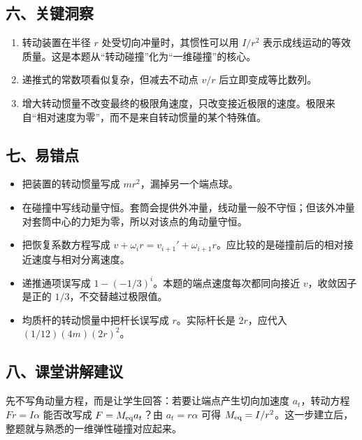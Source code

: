 \documentclass[12pt,a4paper,UTF8]{ctexart}
\newcommand{\tightlist}{\setlength{\itemsep}{0pt}\setlength{\parskip}{0pt}}
\begin{document}
\subsection{六、关键洞察}\label{ux516dux5173ux952eux6d1eux5bdf-1}

\begin{enumerate}
\def\labelenumi{\arabic{enumi}.}
\tightlist
\item
  转动装置在半径 \(r\) 处受切向冲量时，其惯性可以用 \(I/r^2\)
  表示成线运动的等效质量。这是本题从``转动碰撞''化为``一维碰撞''的核心。
\item
  递推式的常数项看似复杂，但减去不动点 \(v/r\) 后立即变成等比数列。
\item
  增大转动惯量不改变最终的极限角速度，只改变接近极限的速度。极限来自``相对速度为零''，而不是来自转动惯量的某个特殊值。
\end{enumerate}

\subsection{七、易错点}\label{ux4e03ux6613ux9519ux70b9-1}

\begin{itemize}
\tightlist
\item
  把装置的转动惯量写成 \(mr^2\)，漏掉另一个端点球。
\item
  在碰撞中写线动量守恒。套筒会提供外冲量，线动量一般不守恒；但该外冲量对套筒中心的力矩为零，所以对该点的角动量守恒。
\item
  把恢复系数方程写成
  \(v+\omega_i r=v_{i+1}'+\omega_{i+1}r\)。应比较的是碰撞前后的相对接近速度与相对分离速度。
\item
  递推通项误写成 \(1-(-1/3)^i\)。本题的端点速度每次都同向接近
  \(v\)，收敛因子是正的 \(1/3\)，不交替越过极限值。
\item
  均质杆的转动惯量中把杆长误写成 \(r\)。实际杆长是 \(2r\)，应代入
  \((1/12)(4m)(2r)^2\)。
\end{itemize}

\subsection{八、课堂讲解建议}\label{ux516bux8bfeux5802ux8bb2ux89e3ux5efaux8bae-1}

先不写角动量方程，而是让学生回答：若要让端点产生切向加速度
\(a_t\)，转动方程 \(Fr=I\alpha\) 能否改写成 \(F=M_{\rm eq}a_t\)？由
\(a_t=r\alpha\) 可得
\(M_{\rm eq}=I/r^2\)。这一步建立后，整题就与熟悉的一维弹性碰撞对应起来。
\end{document}
